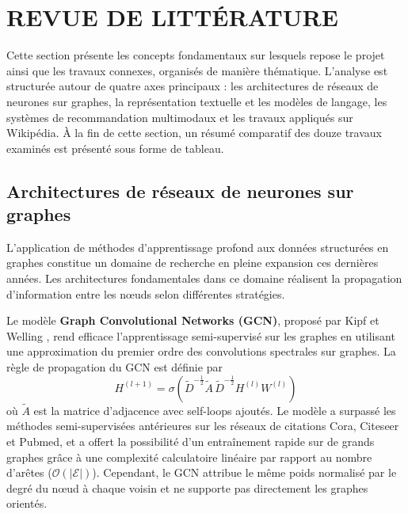 \chapter{REVUE DE LITTÉRATURE}
\thispagestyle{empty}

Cette section présente les concepts fondamentaux sur lesquels repose le projet ainsi que les travaux connexes, organisés de manière thématique. L'analyse est structurée autour de quatre axes principaux : les architectures de réseaux de neurones sur graphes, la représentation textuelle et les modèles de langage, les systèmes de recommandation multimodaux et les travaux appliqués sur Wikipédia. À la fin de cette section, un résumé comparatif des douze travaux examinés est présenté sous forme de tableau.

\section{Architectures de réseaux de neurones sur graphes}

L'application de méthodes d'apprentissage profond aux données structurées en graphes constitue un domaine de recherche en pleine expansion ces dernières années. Les architectures fondamentales dans ce domaine réalisent la propagation d'information entre les n\oe uds selon différentes stratégies.

Le modèle \textbf{Graph Convolutional Networks (GCN)}, proposé par Kipf et Welling \cite{kipf2017semi}, rend efficace l'apprentissage semi-supervisé sur les graphes en utilisant une approximation du premier ordre des convolutions spectrales sur graphes. La règle de propagation du GCN est définie par
\[
    H^{(l+1)} = \sigma\!\left(\tilde{D}^{-\frac{1}{2}}\tilde{A}\,\tilde{D}^{-\frac{1}{2}}H^{(l)}W^{(l)}\right)
\]
où $\tilde{A}$ est la matrice d'adjacence avec self-loops ajoutés. Le modèle a surpassé les méthodes semi-supervisées antérieures sur les réseaux de citations Cora, Citeseer et Pubmed, et a offert la possibilité d'un entraînement rapide sur de grands graphes grâce à une complexité calculatoire linéaire par rapport au nombre d'arêtes ($\mathcal{O}(|\mathcal{E}|)$). Cependant, le GCN attribue le même poids normalisé par le degré du n\oe ud à chaque voisin et ne supporte pas directement les graphes orientés.

